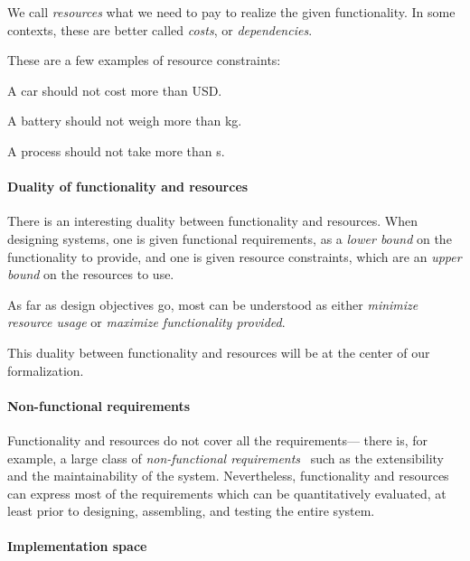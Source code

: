 We call \emph{resources} what we need to pay to realize the given functionality.
In some contexts, these are better called \emph{costs}, or \emph{dependencies}.


\begin{example}
These are a few examples of resource constraints:
\begin{compactitem}
\item A car should not cost more than \unit[15,000]{USD}.
\item A battery should not weigh more than \unit[1]{kg}.
\item A process should not take more than \unit[10]{s}.
\end{compactitem}
\end{example}

\paragraph{Duality of functionality and resources}

There is an interesting duality between functionality and resources. When designing systems, one is given functional requirements, as a \emph{lower bound} on the
functionality to provide, and one is given resource constraints, which are an \emph{upper bound} on the
resources to use.

As far as design objectives go, most can be understood as either \emph{minimize resource usage}
or \emph{maximize functionality provided}.

This duality between functionality and resources will be at the
center of our formalization.

\paragraph{Non-functional requirements}

Functionality and resources do not cover all the requirements--- there is, for example, a
large class of \emph{non-functional requirements}~\cite{??} such as the extensibility and the
maintainability of the system. Nevertheless, functionality and resources can express most of
the requirements which can be quantitatively evaluated, at least prior to designing, assembling,
and testing the entire system.

\paragraph{Implementation space}

